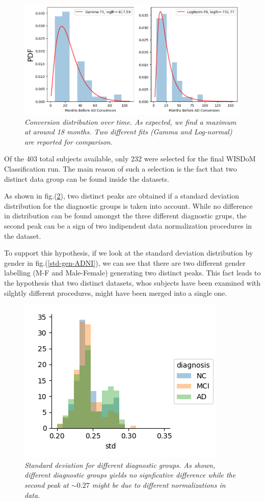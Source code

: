 \documentclass[12pt,openright,twoside,a4paper]{book}
\begin{document}
\begin{figure}[!h]
\centering
\includegraphics[scale=0.65]{conv-comp}
\caption{\textit{Conversion distribution over time. As expected, we find a maximum at around 18 months. Two different fits (Gamma and Log-normal) are reported for comparison.}}
\label{conv-comp}
\end{figure}

Of the 403 total subjects available, only 232 were selected for the final WISDoM Classification run.
The main reason of such a selection is the fact that two distinct data group can be found inside the datasets.

As shown in fig.(\ref{std-ADNI}), two distinct peaks are obtained if a standard deviation distribution for the diagnostic groups is taken into account.
While no difference in distribution can be found amongst the three different diagnostic grups, the second peak can be a sign of two indipendent data normalization procedures in the dataset.

To support this hypothesis, if we look at the standard deviation distribution by gender in fig.(\ref{std-gen-ADNI}), we can see that there are two different gender labelling (M-F and Male-Female) generating two distinct peaks. 
This fact leads to the hypothesis that two distinct datasets, whos subjects have been examined with silghtly different procedures, might have been merged into a single one.

\begin{figure}[!h]
\centering
\includegraphics[scale=0.75]{std-ADNI}
\caption{\textit{Standard deviation for different diagnostic groups. As shown, different diagnostic groups yields no signficative difference while the second peak at $\sim 0.27$ might be due to different normalizations in data.}}
\label{std-ADNI}
\end{figure}
\end{document}

